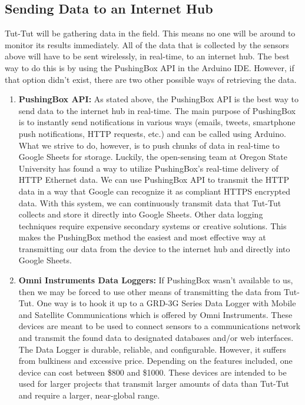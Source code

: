 \documentclass[letterpaper,10pt,draftclsnofoot,onecolumn]{article}
\begin{document}
\subsection{Sending Data to an Internet Hub}
Tut-Tut will be gathering data in the field. This means no one will be around to monitor its results immediately. All of the data that is collected by the sensors above will have to be sent wirelessly, in real-time, to an internet hub. The best way to do this is by using the PushingBox API in the Arduino IDE. However, if that option didn't exist, there are two other possible ways of retrieving the data.

\begin{enumerate}
    \item \textbf{PushingBox API:} As stated above, the PushingBox API is the best way to send data to the internet hub in real-time. The main purpose of PushingBox is to instantly send notifications in various ways (emails, tweets, smartphone push notifications, HTTP requests, etc.) and can be called using Arduino. \cite{pushingbox} What we strive to do, however, is to push chunks of data in real-time to Google Sheets for storage. Luckily, the open-sensing team at Oregon State University has found a way to utilize PushingBox's real-time delivery of HTTP Ethernet data. We can use PushingBox API to transmit the HTTP data in a way that Google can recognize it as compliant HTTPS encrypted data. \cite{realtimepushingbox} With this system, we can continuously transmit data that Tut-Tut collects and store it directly into Google Sheets. Other data logging techniques require expensive secondary systems or creative solutions. This makes the PushingBox method the easiest and most effective way at transmitting our data from the device to the internet hub and directly into Google Sheets.
    \item \textbf{Omni Instruments Data Loggers:} If PushingBox wasn't available to us, then we may be forced to use other means of transmitting the data from Tut-Tut. One way is to hook it up to a GRD-3G Series Data Logger with Mobile and Satellite Communications which is offered by Omni Instruments. These devices are meant to be used to connect sensors to a communications network and transmit the found data to designated databases and/or web interfaces. The Data Logger is durable, reliable, and configurable. However, it suffers from bulkiness and excessive price. Depending on the features included, one device can cost between \$800 and \$1000. These devices are intended to be used for larger projects that transmit larger amounts of data than Tut-Tut and require a larger, near-global range. \cite{omni} 

\end{enumerate}
\end{document}

